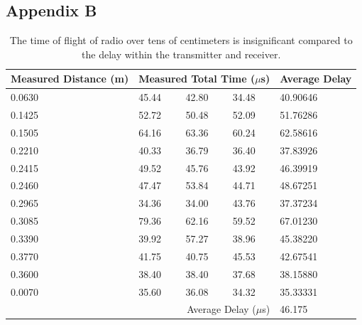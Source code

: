 \documentclass{article}
\begin{document}
  \subsection{Appendix B}\label{appendix:rf-rx-tx}

    \begin{table}[H]
      \begin{tabular}{|l|l|l|l|l|}
        \hline
        Measured Distance (m) & \multicolumn{3}{|l|}{Measured Total Time ($\mu$s)} & Average Delay \\
        \hline
        0.0630 & 45.44 & 42.80 & 34.48 & 40.90646 \\
        0.1425 & 52.72 & 50.48 & 52.09 & 51.76286 \\
        0.1505 & 64.16 & 63.36 & 60.24 & 62.58616 \\
        0.2210 & 40.33 & 36.79 & 36.40 & 37.83926 \\
        0.2415 & 49.52 & 45.76 & 43.92 & 46.39919 \\
        0.2460 & 47.47 & 53.84 & 44.71 & 48.67251 \\
        0.2965 & 34.36 & 34.00 & 43.76 & 37.37234 \\
        0.3085 & 79.36 & 62.16 & 59.52 & 67.01230 \\
        0.3390 & 39.92 & 57.27 & 38.96 & 45.38220 \\
        0.3770 & 41.75 & 40.75 & 45.53 & 42.67541 \\
        0.3600 & 38.40 & 38.40 & 37.68 & 38.15880 \\
        0.0070 & 35.60 & 36.08 & 34.32 & 35.33331 \\
        \hline
        \multicolumn{4}{|r|}{Average Delay ($\mu$s)} & 46.175 \\
        \hline
      \end{tabular}
      \caption{The time of flight of radio over tens of centimeters is insignificant compared to the delay within the transmitter and receiver.}
      \label{table:rf-rx-tx}
    \end{table}



\end{document}
